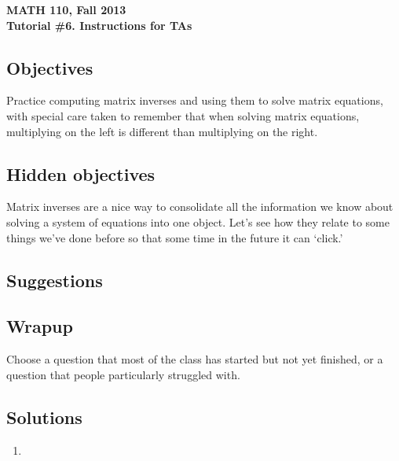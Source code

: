 \documentclass[11pt]{exam}
\newcommand{\mthCourse}{MATH 110}
\newcommand{\mthTerm}{Fall 2013}
\newcommand{\mthTutorialNumber}{6}
\begin{document}
\newpage
{\small
	\begin{center}
		{\bf \mthCourse, \mthTerm}\\ 
		{\bf Tutorial \#\mthTutorialNumber. Instructions for TAs}
	\end{center}
}

\subsection*{Objectives}

	Practice computing matrix inverses and using them to solve matrix equations,
	with special care taken to remember that when solving matrix equations, multiplying
	on the left is different than multiplying on the right.

\subsection*{Hidden objectives}

	Matrix inverses are a nice way to consolidate all the information
	we know about solving a system of equations into one object.  Let's
	see how they relate to some things we've done before so that some time
	in the future it can `click.'

\subsection*{Suggestions}

\subsection*{Wrapup}
	Choose a question that most of the class has started but not yet finished,
	or a question that people particularly struggled with.

\subsection*{Solutions}
\begin{enumerate}
	\item
\end{enumerate}
	
\end{document}
